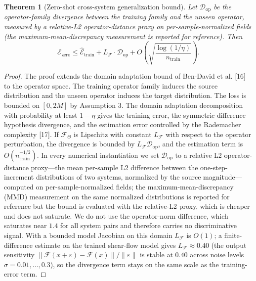 \documentclass[preprint,12pt]{elsarticle}
\newtheorem{theorem}{Theorem}
\begin{document}
\begin{theorem}[Zero-shot cross-system generalization bound]
Let $\mathcal{D}_{\mathrm{op}}$ be the operator-family divergence between the training family and the unseen operator, measured by a relative-L2 operator-distance proxy on per-sample-normalized fields (the maximum-mean-discrepancy measurement is reported for reference). Then
\begin{equation}
\mathcal{E}_{\mathrm{zero}}\le\hat{\mathcal{E}}_{\mathrm{train}}+L_{\mathcal{F}}\cdot\mathcal{D}_{\mathrm{op}}+O\left(\sqrt{\frac{\log(1/\eta)}{n_{\mathrm{train}}}}\right).
\end{equation}
\end{theorem}

\begin{proof}
The proof extends the domain adaptation bound of Ben-David et al. [16] to the operator space. The training operator family induces the source distribution and the unseen operator induces the target distribution. The loss is bounded on $[0,2M]$ by Assumption 3. The domain adaptation decomposition with probability at least $1-\eta$ gives the training error, the symmetric-difference hypothesis divergence, and the estimation error controlled by the Rademacher complexity [17]. If $\mathcal{F}_\Theta$ is Lipschitz with constant $L_{\mathcal{F}}$ with respect to the operator perturbation, the divergence is bounded by $L_{\mathcal{F}}\mathcal{D}_{\mathrm{op}}$, and the estimation term is $O(n_{\mathrm{train}}^{-1/2})$. In every numerical instantiation we set $\mathcal{D}_{\mathrm{op}}$ to a relative L2 operator-distance proxy---the mean per-sample L2 difference between the one-step-increment distributions of two systems, normalized by the source magnitude---computed on per-sample-normalized fields; the maximum-mean-discrepancy (MMD) measurement on the same normalized distributions is reported for reference but the bound is evaluated with the relative-L2 proxy, which is cheaper and does not saturate. We do not use the operator-norm difference, which saturates near $1.4$ for all system pairs and therefore carries no discriminative signal. With a bounded model Jacobian on this domain $L_{\mathcal{F}}$ is $O(1)$; a finite-difference estimate on the trained shear-flow model gives $L_{\mathcal{F}}\approx 0.40$ (the output sensitivity $\|\mathcal{F}(x+\varepsilon)-\mathcal{F}(x)\|/\|\varepsilon\|$ is stable at $0.40$ across noise levels $\sigma=0.01,\dots,0.3$), so the divergence term stays on the same scale as the training-error term.
\end{proof}
\end{document}
